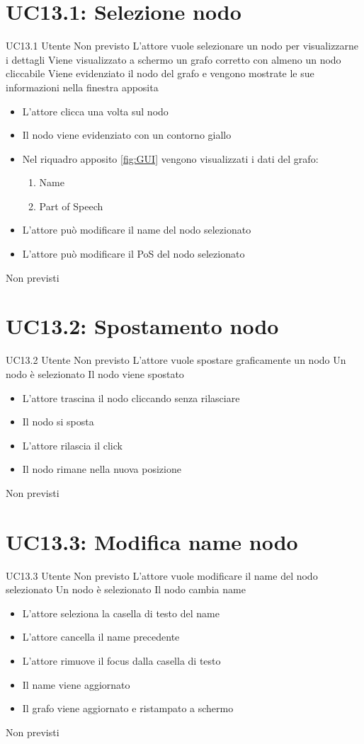 \documentclass[../AnalisideiRequisiti.tex]{subfiles}
\begin{document}
\section{UC13.1: Selezione nodo}
\UserCase
{UC13.1}
{Utente}
{Non previsto}
{L'attore vuole selezionare un nodo per visualizzarne i dettagli}
{Viene visualizzato a schermo un grafo corretto con almeno un nodo cliccabile }
{Viene evidenziato il nodo del grafo e vengono mostrate le sue informazioni nella finestra apposita}
{
	\begin{itemize}
		\item{} L'attore clicca una volta sul nodo
		\item{} Il nodo viene evidenziato con un contorno giallo
		\item{} Nel riquadro apposito \ref{fig:GUI} vengono visualizzati i dati del grafo:
		\begin{enumerate}
			\item{} Name
			\item{} Part of Speech
		\end{enumerate}
		\item{} L'attore può modificare il name del nodo selezionato 
		\item{} L'attore può modificare il PoS del nodo selezionato  
	\end{itemize}
}
{Non previsti}

\section{UC13.2: Spostamento nodo}
\UserCase
{UC13.2}
{Utente}
{Non previsto}
{L'attore vuole spostare graficamente un nodo}
{Un nodo è selezionato }
{Il nodo viene spostato}
{
	\begin{itemize}
		\item{} L'attore trascina il nodo cliccando senza rilasciare
		\item{} Il nodo si sposta
		\item{} L'attore rilascia il click
		\item{} Il nodo rimane nella nuova posizione
	\end{itemize}
}
{Non previsti}

\section{UC13.3: Modifica name nodo}
\UserCase
{UC13.3}
{Utente}
{Non previsto}
{L'attore vuole modificare il name del nodo selezionato}
{Un nodo è selezionato }
{Il nodo cambia name}
{
	\begin{itemize}
		\item{} L'attore seleziona la casella di testo del name
		\item{} L'attore cancella il name precedente
		\item{} L'attore rimuove il focus dalla casella di testo
		\item{} Il name viene aggiornato
		\item{} Il grafo viene aggiornato e ristampato a schermo 
	\end{itemize}
}
{Non previsti}
\end{document}
